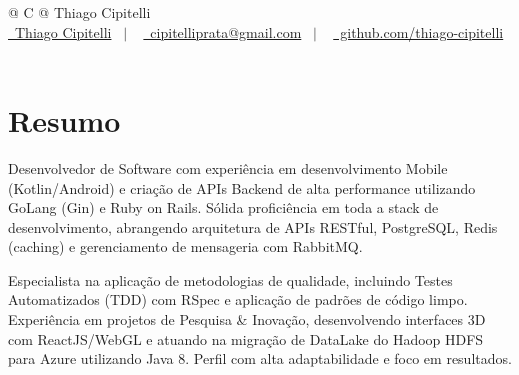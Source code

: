 \documentclass[a4paper,10.5pt]{article}
\begin{document}
\pagestyle{empty} 



\begin{tabularx}{\linewidth}{@{} C @{}}
\Huge{Thiago Cipitelli} \\[7.5pt]
\href{https://www.linkedin.com/in/thiago-cipitelli/}{\raisebox{-0.05\height}\faLinkedin\ Thiago Cipitelli} \ $|$ \ 
\href{mailto:cipitelliprata@gmail.com}{\raisebox{-0.05\height}\faEnvelope \ cipitelliprata@gmail.com} \ $|$ \ 
\href{https://github.com/thiago-cipitelli}{\raisebox{-0.05\height}\faGithub\ github.com/thiago-cipitelli} \ \ 
\end{tabularx}


\section{Resumo}
Desenvolvedor de Software com experiência em desenvolvimento Mobile (Kotlin/Android) e criação de APIs Backend de alta performance utilizando GoLang (Gin) e Ruby on Rails. Sólida proficiência em toda a stack de desenvolvimento, abrangendo arquitetura de APIs RESTful, PostgreSQL, Redis (caching) e gerenciamento de mensageria com RabbitMQ.

Especialista na aplicação de metodologias de qualidade, incluindo Testes Automatizados (TDD) com RSpec e aplicação de padrões de código limpo. Experiência em projetos de Pesquisa & Inovação, desenvolvendo interfaces 3D com ReactJS/WebGL e atuando na migração de DataLake do Hadoop HDFS para Azure utilizando Java 8. Perfil com alta adaptabilidade e foco em resultados. 
\end{document}
